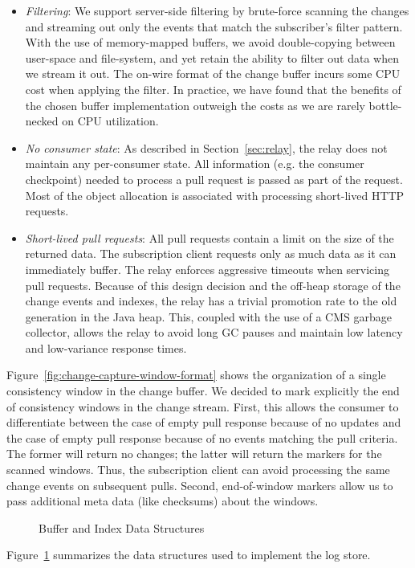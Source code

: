 \begin{itemize}
\item \emph{Filtering}: We support server-side filtering by brute-force scanning the changes and streaming out only the events that match the subscriber's filter pattern. With the use of memory-mapped buffers, we avoid double-copying between user-space and file-system, and yet retain the ability to filter out data when we stream it out. The on-wire format of the change buffer incurs some CPU cost when applying the filter. In practice, we have found that the benefits of the chosen buffer implementation outweigh the costs as we are rarely bottle-necked on CPU utilization.

\item \emph{No consumer state}: As described in Section~\ref{sec:relay}, the relay does not maintain any per-consumer state. All information (e.g. the consumer checkpoint) needed to process a pull request is passed as part of the request. Most of the object allocation is associated with processing short-lived HTTP requests.

\item \emph{Short-lived pull requests}: All pull requests contain a limit on the size of the returned data. The subscription client requests only as much data as it can immediately buffer. The relay enforces aggressive timeouts when servicing pull requests. Because of this design decision and the off-heap storage of the change events and indexes, the relay has a trivial promotion rate to the old generation in the Java heap. This, coupled with the use of a CMS garbage collector, allows the relay to avoid long GC pauses and maintain low latency and low-variance response times.

\end{itemize}

Figure~\ref{fig:change-capture-window-format} shows the organization of a single consistency window in the change buffer. We decided to mark explicitly the end of consistency windows in the change stream. First, this allows the consumer to differentiate between the case of empty pull response because of no updates and the case of empty pull response because of no events matching the pull criteria. The former will return no changes; the latter will return the markers for the scanned windows. Thus, the subscription client can avoid processing the same change events on subsequent pulls. Second, end-of-window markers allow us to pass additional meta data (like checksums) about the windows.

\begin{figure}
\centering
{}
\caption{Buffer and Index Data Structures}
\label{fig:buffer-index}
\end{figure}
Figure~\ref{fig:buffer-index} summarizes the data structures used to implement the log store. 


